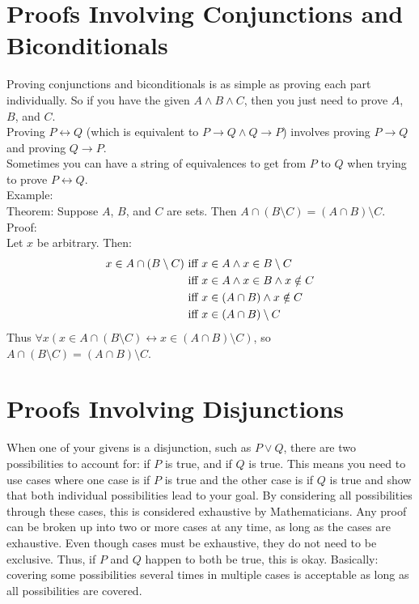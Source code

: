 \documentclass{article}
\begin{document}
\section{Proofs Involving Conjunctions and Biconditionals}
Proving conjunctions and biconditionals is as simple as proving each part individually. So if you have the given $A \land B \land C$, then you just need to prove $A$, $B$, and $C$.\\

\noindent Proving $P \leftrightarrow Q$ (which is equivalent to $P \rightarrow Q \land Q \rightarrow P$) involves proving $P \rightarrow Q$ and proving $Q \rightarrow P$.\\

\noindent Sometimes you can have a string of equivalences to get from $P$ to $Q$ when trying to prove $P \leftrightarrow Q$.\\
Example:\\
Theorem: Suppose $A$, $B$, and $C$ are sets. Then $A \cap (B \setminus C) = (A \cap B) \setminus C$.\\

\noindent Proof:\\
\noindent Let $x$ be arbitrary. Then:
\begin{align}
x \in A \cap (B \setminus C) \text{ iff }& x \in A \land x \in B \setminus C \\
\text{ iff }& x \in A \land x \in B \land x \notin C \\
\text{ iff }& x \in (A \cap B) \land x \notin C \\
\text{ iff }& x \in (A \cap B) \setminus C 
\end{align}
Thus $\forall x(x \in A \cap (B \setminus C) \leftrightarrow x \in (A \cap B) \setminus C)$, so $A \cap (B \setminus C) = (A \cap B) \setminus C$.

\section{Proofs Involving Disjunctions}
When one of your givens is a disjunction, such as $P \lor Q$, there are two possibilities to account for: if $P$ is true, and if $Q$ is true. This means you need to use \glspl{case} where one case is if $P$ is true and the other case is if $Q$ is true and show that both individual possibilities lead to your goal. By considering all possibilities through these cases, this is considered \gls{exhaustive} by Mathematicians. Any proof can be broken up into two or more cases at any time, as long as the cases are exhaustive. Even though cases must be exhaustive, they do not need to be exclusive. Thus, if $P$ and $Q$ happen to both be true, this is okay. Basically: covering some possibilities several times in multiple cases is acceptable as long as all possibilities are covered.\\
\end{document}
